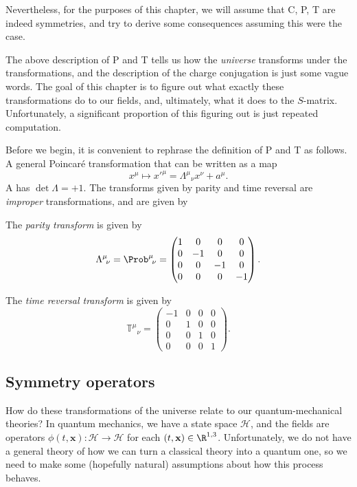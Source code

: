 \documentclass[a4paper]{article}
\begin{document}
Nevertheless, for the purposes of this chapter, we will assume that C, P, T are indeed symmetries, and try to derive some consequences assuming this were the case.

The above description of P and T tells us how the \emph{universe} transforms under the transformations, and the description of the charge conjugation is just some vague words. The goal of this chapter is to figure out what exactly these transformations do to our fields, and, ultimately, what it does to the $S$-matrix. Unfortunately, a significant proportion of this figuring out is just repeated computation.

Before we begin, it is convenient to rephrase the definition of P and T as follows. A general Poincar\'e transformation that can be written as a map
\[
  x^\mu \mapsto x'^\mu = \Lambda^\mu\!_\nu x^\nu + a^\mu.
\]
A  has $\det \Lambda = +1$. The transforms given by parity and time reversal are \emph{improper} transformations, and are given by
\begin{defi}
  The \emph{parity transform} is given by
  \[
    \Lambda^\mu\!_\nu = \Prob^\mu\!_\nu =
    \begin{pmatrix}
      1 & 0 & 0 & 0\\
      0 & -1 & 0 & 0\\
      0 & 0 & -1 & 0\\
      0 & 0 & 0 & -1
    \end{pmatrix}.
  \]
\end{defi}


\begin{defi}
  The \emph{time reversal transform} is given by
  \[
    \mathbb{T}^\mu\!_\nu =
    \begin{pmatrix}
      -1 & 0 & 0 & 0\\
      0 & 1 & 0 & 0\\
      0 & 0 & 1 & 0\\
      0 & 0 & 0 & 1
    \end{pmatrix}.
  \]
\end{defi}

\subsection{Symmetry operators}
How do these transformations of the universe relate to our quantum-mechanical theories? In quantum mechanics, we have a state space $\mathcal{H}$, and the fields are operators $\phi(t, \mathbf{x}): \mathcal{H} \to \mathcal{H}$ for each $(t, \mathbf{x}) \in \R^{1, 3}$. Unfortunately, we do not have a general theory of how we can turn a classical theory into a quantum one, so we need to make some (hopefully natural) assumptions about how this process behaves.
\end{document}
